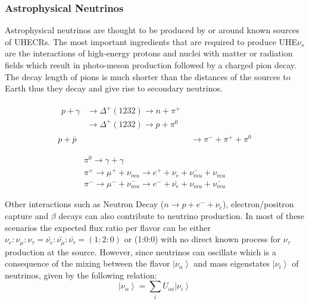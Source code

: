 \subsubsection*{Astrophysical Neutrinos}
\label{subsubsec:AstroNu}

Astrophysical neutrinos are thought to be produced by or around known sources of UHECRs. The most important ingredients that are required to produce UHE$\nu_s$ are the interactions of high-energy protons and nuclei with matter or radiation fields which result in photo-meson production followed by a charged pion decay. The decay length of pions is much shorter than the distances of the sources to Earth thus they decay and give rise to secondary neutrinos. 

\begin{subequations}\label{eq:Nuprod_1}
  \begin{align}
    \begin{split}
      p + \gamma &\longrightarrow \Delta^+(1232 ) \longrightarrow n+\pi^+ \\ 
                      &\longrightarrow \Delta^+(1232 ) \longrightarrow p+\pi^0
    \end{split} \\
      p + \bar{p} &\longrightarrow \pi^- + \pi^+ + \pi^0 
  \end{align}
\end{subequations}

\begin{subequations}\label{eq:Nuprod_2}
  \begin{align}  
    \pi^0 \longrightarrow \gamma + \gamma \\
    \pi^+ \longrightarrow \mu^+ + \nu_{mu} \longrightarrow e^+ + \nu_{e} + \bar{\nu_{mu}} + \nu_{mu} \\
    \pi^- \longrightarrow \mu^- + \bar{\nu_{mu}} \longrightarrow e^- + \bar{\nu_{e}} + \nu_{mu} + \bar{\nu_{mu}}
  \end{align}
\end{subequations}

Other interactions such as Neutron Decay ($n \longrightarrow p + e^- + \nu_{e} $), electron/positron capture and $\beta$ decays can also contribute to neutrino production. In most of these scenarios the expected flux ratio per flavor can be either $ \nu_{e} : \nu_{\mu} : \nu_{\tau} = \bar{\nu_{e}}: \bar{\nu_{\mu}}: \bar{\nu_{\tau}} = (1:2:0) $ or (1:0:0) with no direct known process for $\nu_{\tau}$ production at the source. However, since neutrinos can oscillate which is a consequence of the mixing between the flavor  $\left| \nu_{\alpha} \right\rangle $ and mass eigenstates $\left| \nu_{i} \right\rangle $  of neutrinos, given by the following relation:
\begin{equation}
\left| \nu_{\alpha} \right\rangle  = \sum_i U_{\alpha i} \left| \nu_{i} \right\rangle
\end{equation}

